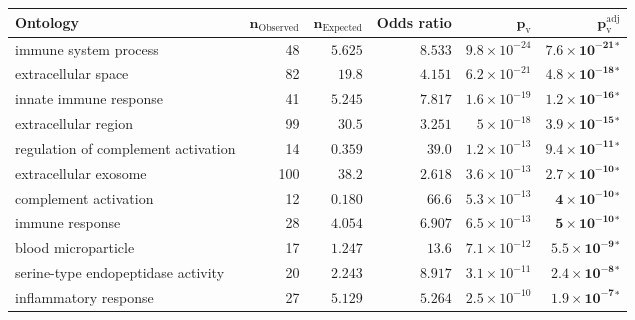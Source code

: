 \documentclass{article}
\begin{document}
    \begin{table*}[!ht]
        \centering
        \begin{adjustbox}{width = 1\textwidth}
            \small
            \begin{tabular}{|l|r|r|r|r|r|}
                \toprule
                \textbf{Ontology} &
                $\bm{n_{\mathrm{Observed}}}$ &
                $\bm{n_{\mathrm{Expected}}}$ &
                \textbf{Odds ratio} &
                $\bm{p_{\mathrm{v}}}$ &
                $\bm{p_{\mathrm{v}}^{\mathrm{adj}}}$ \\
                \midrule
                immune system process                             & 48  & $ 5.625$ & $ 8.533$ & $9.8\times 10^{-24}$ & $\bm{7.6\times 10^{-21}{^*}}$ \\
                extracellular space                               & 82  & $  19.8$   & $ 4.151$ & $6.2\times 10^{-21}$ & $\bm{4.8\times 10^{-18}{^*}}$ \\
                innate immune response                            & 41  & $ 5.245$ & $ 7.817$ & $1.6\times 10^{-19}$ & $\bm{1.2\times 10^{-16}{^*}}$ \\
                extracellular region                              & 99  & $  30.5$   & $ 3.251$ & $ 5\times 10^{-18}$  & $\bm{3.9\times 10^{-15}{^*}}$ \\
                regulation of complement activation               & 14  & $ 0.359$ & $  39.0$   & $1.2\times 10^{-13}$ & $\bm{9.4\times 10^{-11}{^*}}$ \\
                extracellular exosome                             & 100 & $  38.2$   & $ 2.618$ & $3.6\times 10^{-13}$ & $\bm{2.7\times 10^{-10}{^*}}$ \\
                complement activation                             & 12  & $ 0.180$ & $  66.6$   & $5.3\times 10^{-13}$ & $\bm{ 4\times 10^{-10}{^*}}$  \\
                immune response                                   & 28  & $ 4.054$ & $ 6.907$ & $6.5\times 10^{-13}$ & $\bm{ 5\times 10^{-10}{^*}}$  \\
                blood microparticle                               & 17  & $ 1.247$ & $  13.6$   & $7.1\times 10^{-12}$ & $\bm{5.5\times 10^{-9}{^*}}$  \\
                serine-type endopeptidase activity                & 20  & $ 2.243$ & $ 8.917$ & $3.1\times 10^{-11}$ & $\bm{2.4\times 10^{-8}{^*}}$  \\
                inflammatory response                             & 27  & $ 5.129$ & $ 5.264$ & $2.5\times 10^{-10}$ & $\bm{1.9\times 10^{-7}{^*}}$  \\

\end{tabular}
\end{adjustbox}
\end{table*}
\end{document}
